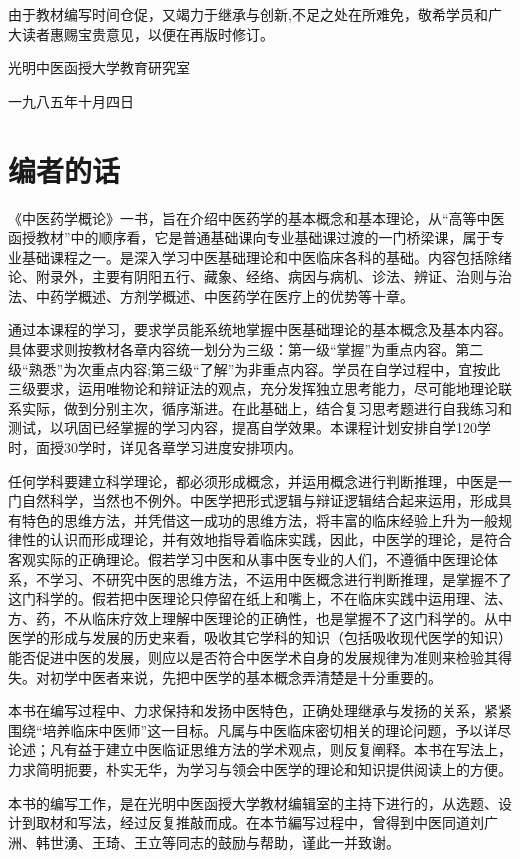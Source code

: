 \documentclass[a4paper,12pt,UTF8,twoside]{ctexbook}
\begin{document}
由于教材编写时间仓促，又竭力于继承与创新,不足之处在所难免，敬希学员和广大读者惠赐宝贵意见，以便在再版时修订。

光明中医函授大学教育研究室

一九八五年十月四日

\chapter{编者的话}

《中医药学概论》一书，旨在介绍中医药学的基本概念和基本理论，从“高等中医函授教材”中的顺序看，它是普通基础课向专业基础课过渡的一门桥梁课，属于专业基础课程之一。是深入学习中医基础理论和中医临床各科的基础。内容包括除绪论、附录外，主要有阴阳五行、藏象、经络、病因与病机、诊法、辨证、治则与治法、中药学概述、方剂学概述、中医药学在医疗上的优势等十章。

通过本课程的学习，要求学员能系统地掌握中医基础理论的基本概念及基本内容。具体要求则按教材各章内容统一划分为三级：第一级“掌握”为重点内容。第二级“熟悉”为次重点内容;第三级“了解”为非重点内容。学员在自学过程中，宜按此三级要求，运用唯物论和辩证法的观点，充分发挥独立思考能力，尽可能地理论联系实际，做到分别主次，循序渐进。在此基础上，结合复习思考题进行自我练习和测试，以巩固已经掌握的学习内容，提髙自学效果。本课程计划安排自学120学时，面授30学时，详见各章学习进度安排项内。

任何学科要建立科学理论，都必须形成概念，并运用概念进行判断推理，中医是一门自然科学，当然也不例外。中医学把形式逻辑与辩证逻辑结合起来运用，形成具有特色的思维方法，并凭借这一成功的思维方法，将丰富的临床经验上升为一般规律性的认识而形成理论，并有效地指导着临床实践，因此，中医学的理论，是符合客观实际的正确理论。假若学习中医和从事中医专业的人们，不遵循中医理论体系，不学习、不研究中医的思维方法，不运用中医概念进行判断推理，是掌握不了这门科学的。假若把中医理论只停留在纸上和嘴上，不在临床实践中运用理、法、方、药，不从临床疗效上理解中医理论的正确性，也是掌握不了这门科学的。从中医学的形成与发展的历史来看，吸收其它学科的知识（包括吸收现代医学的知识）能否促进中医的发展，则应以是否符合中医学术自身的发展规律为准则来检验其得失。对初学中医者来说，先把中医学的基本概念弄清楚是十分重要的。

本书在编写过程中、力求保持和发扬中医特色，正确处理继承与发扬的关系，紧紧围绕“培养临床中医师”这一目标。凡属与中医临床密切相关的理论问题，予以详尽论述；凡有益于建立中医临证思维方法的学术观点，则反复阐释。本书在写法上，力求简明扼要，朴实无华，为学习与领会中医学的理论和知识提供阅读上的方便。

本书的编写工作，是在光明中医函授大学教材编辑室的主持下进行的，从选题、设计到取材和写法，经过反复推敲而成。在本节編写过程中，曾得到中医同道刘广洲、韩世湧、王琦、王立等同志的鼓励与帮助，谨此一并致谢。
\end{document}
